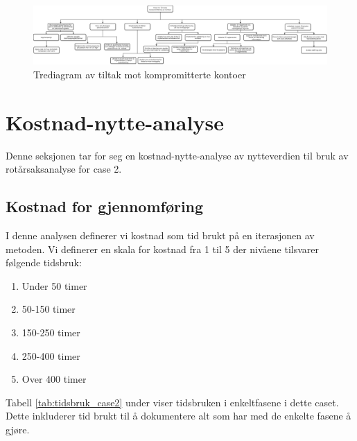 \begin{figure}[H] 
    \centering    
    \includegraphics[scale=0.4, angle=90]{case_2/bilder/trediagram.pdf}
    \caption[Trediagram av tiltak mot kompromitterte kontoer]{Trediagram av tiltak mot kompromitterte kontoer}
    \label{fig:trediagram-case2}
\end{figure}

\section{Kostnad-nytte-analyse}
\label{kost-nytte-case2}
Denne seksjonen tar for seg en kostnad-nytte-analyse av nytteverdien til bruk av rotårsaksanalyse for case 2. 

\subsection{Kostnad for gjennomføring}
I denne analysen definerer vi kostnad som tid brukt på en iterasjonen av metoden. Vi definerer en skala for kostnad fra 1 til 5 der nivåene tilsvarer følgende tidsbruk:

\begin{enumerate}
    \item Under 50 timer
    \item 50-150 timer
    \item 150-250 timer
    \item 250-400 timer
    \item Over 400 timer
\end{enumerate}

Tabell \ref{tab:tidsbruk_case2} under viser tidsbruken i enkeltfasene i dette caset. Dette inkluderer tid brukt til å dokumentere alt som har med de enkelte fasene å gjøre. 

